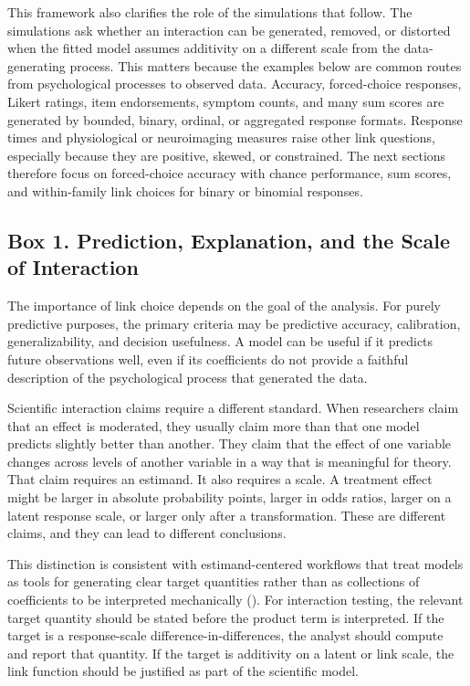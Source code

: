 \documentclass[
  man,
  longtable,
  nolmodern,
  notxfonts,
  notimes,
  colorlinks=true,linkcolor=blue,citecolor=blue,urlcolor=blue]{apa7}
\begin{document}
This framework also clarifies the role of the simulations that follow.
The simulations ask whether an interaction can be generated, removed, or
distorted when the fitted model assumes additivity on a different scale
from the data-generating process. This matters because the examples
below are common routes from psychological processes to observed data.
Accuracy, forced-choice responses, Likert ratings, item endorsements,
symptom counts, and many sum scores are generated by bounded, binary,
ordinal, or aggregated response formats. Response times and
physiological or neuroimaging measures raise other link questions,
especially because they are positive, skewed, or constrained. The next
sections therefore focus on forced-choice accuracy with chance
performance, sum scores, and within-family link choices for binary or
binomial responses.

\subsection{Box 1. Prediction, Explanation, and the Scale of
Interaction}\label{box-1.-prediction-explanation-and-the-scale-of-interaction}

The importance of link choice depends on the goal of the analysis. For
purely predictive purposes, the primary criteria may be predictive
accuracy, calibration, generalizability, and decision usefulness. A
model can be useful if it predicts future observations well, even if its
coefficients do not provide a faithful description of the psychological
process that generated the data.

Scientific interaction claims require a different standard. When
researchers claim that an effect is moderated, they usually claim more
than that one model predicts slightly better than another. They claim
that the effect of one variable changes across levels of another
variable in a way that is meaningful for theory. That claim requires an
estimand. It also requires a scale. A treatment effect might be larger
in absolute probability points, larger in odds ratios, larger on a
latent response scale, or larger only after a transformation. These are
different claims, and they can lead to different conclusions.

This distinction is consistent with estimand-centered workflows that
treat models as tools for generating clear target quantities rather than
as collections of coefficients to be interpreted mechanically
(). For
interaction testing, the relevant target quantity should be stated
before the product term is interpreted. If the target is a
response-scale difference-in-differences, the analyst should compute and
report that quantity. If the target is additivity on a latent or link
scale, the link function should be justified as part of the scientific
model.
\end{document}
